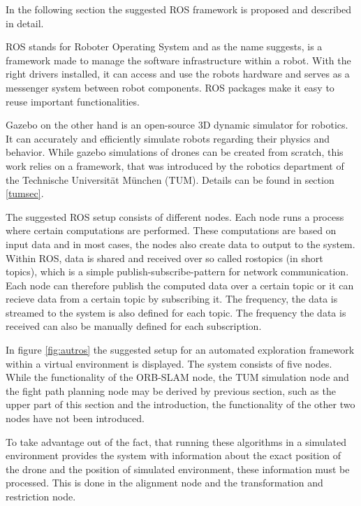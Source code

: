 	In the following section the suggested ROS framework is proposed and described in detail. 
		
	ROS stands for Roboter Operating System and as the name suggests, is a framework made to manage the software infrastructure within a robot. With the right drivers installed, 
	it can access and use the robots hardware and serves as a messenger system between robot components. ROS packages make it easy to 
	reuse important functionalities.

	Gazebo on the other hand is an open-source 3D dynamic simulator for robotics. It can accurately and efficiently simulate robots regarding
	their physics and behavior. While gazebo simulations of drones can be created from scratch, this work relies on a framework, that was introduced 
	by the robotics department of the Technische Universität München (TUM). Details can be found in section \ref{tumsec}.
	
	The suggested ROS setup consists of different nodes. Each node runs a process where certain computations are performed. These computations are based on input data
	and in most cases, the nodes also create data to output to the system. Within ROS, data is shared and received over so called rostopics (in short topics), which is a simple publish-subscribe-pattern 
	for network communication. Each node can therefore publish the computed 
	data over a certain topic or it can recieve data from a certain topic by subscribing it. The frequency, the data is streamed to the system is also defined for each 
	topic. The frequency the data is received can also be manually defined for each subscription. 
	
	
	In figure \ref{fig:autros} the suggested setup for an automated exploration framework within a virtual environment is displayed. The system consists of five nodes. 
	While the functionality of the ORB-SLAM node, the TUM simulation node and the fight path planning node may be derived by previous section, such as the upper part of 
	this section and the introduction, the functionality of the other two nodes have not been introduced. 
	
	To take advantage out of the fact, that running these algorithms in a simulated environment provides the system with information about the exact position of the 
	drone and the position of simulated environment, these information must be processed. This is done in the alignment node and the transformation and restriction node. 
	
